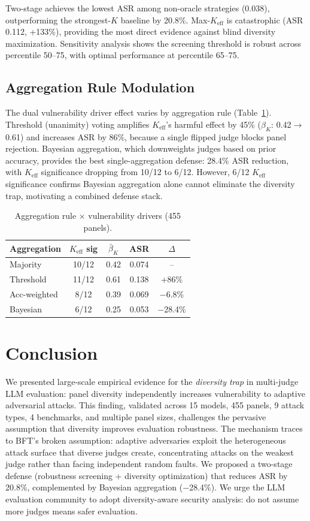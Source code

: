 \documentclass[11pt,a4paper]{article}
\newcommand{\keff}{K_{\text{eff}}}
\begin{document}
Two-stage achieves the lowest ASR among non-oracle strategies (0.038), outperforming the strongest-$K$ baseline by 20.8\%. Max-$\keff$ is catastrophic (ASR 0.112, +133\%), providing the most direct evidence against blind diversity maximization. Sensitivity analysis shows the screening threshold is robust across percentile 50--75, with optimal performance at percentile 65--75.

\subsection{Aggregation Rule Modulation}

The dual vulnerability driver effect varies by aggregation rule (Table~\ref{tab:aggregation}). Threshold (unanimity) voting amplifies $\keff$'s harmful effect by 45\% ($\beta_K$: 0.42$\to$0.61) and increases ASR by 86\%, because a single flipped judge blocks panel rejection. Bayesian aggregation, which downweights judges based on prior accuracy, provides the best single-aggregation defense: 28.4\% ASR reduction, with $\keff$ significance dropping from 10/12 to 6/12. However, 6/12 $\keff$ significance confirms Bayesian aggregation alone cannot eliminate the diversity trap, motivating a combined defense stack.

\begin{table}[t]
\centering
\small
\caption{Aggregation rule $\times$ vulnerability drivers (455 panels).}
\label{tab:aggregation}
\begin{tabular}{lcccc}
\toprule
Aggregation & $\keff$ sig & $\bar{\beta}_K$ & ASR & $\Delta$ \\
\midrule
Majority & 10/12 & 0.42 & 0.074 & -- \\
Threshold & 11/12 & 0.61 & 0.138 & +86\% \\
Acc-weighted & 8/12 & 0.39 & 0.069 & $-$6.8\% \\
Bayesian & 6/12 & 0.25 & 0.053 & $-$28.4\% \\
\bottomrule
\end{tabular}
\end{table}

\section{Conclusion}

We presented large-scale empirical evidence for the \emph{diversity trap} in multi-judge LLM evaluation: panel diversity independently increases vulnerability to adaptive adversarial attacks. This finding, validated across 15 models, 455 panels, 9 attack types, 4 benchmarks, and multiple panel sizes, challenges the pervasive assumption that diversity improves evaluation robustness. The mechanism traces to BFT's broken assumption: adaptive adversaries exploit the heterogeneous attack surface that diverse judges create, concentrating attacks on the weakest judge rather than facing independent random faults. We proposed a two-stage defense (robustness screening + diversity optimization) that reduces ASR by 20.8\%, complemented by Bayesian aggregation ($-$28.4\%). We urge the LLM evaluation community to adopt diversity-aware security analysis: do not assume more judges means safer evaluation.
\end{document}
